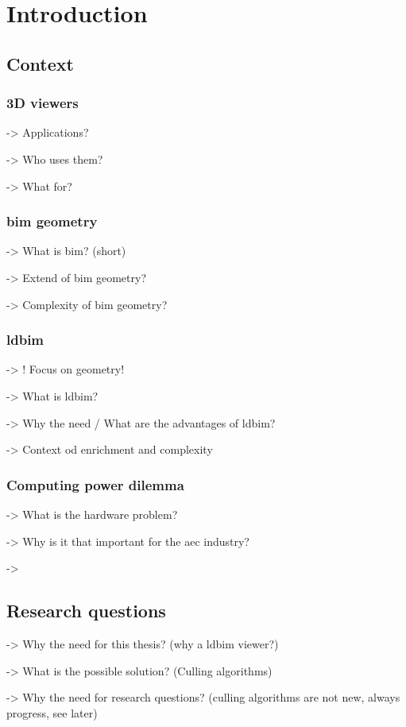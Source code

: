 \chapter{Introduction}
\section{Context}
\subsection{3D viewers}
-> Applications?

-> Who uses them?

-> What for?

\subsection{\acs{bim} geometry}
-> What is \ac{bim}? (short)

-> Extend of \ac{bim} geometry?

-> Complexity of \ac{bim} geometry?

\subsection{\acs{ldbim}}
-> ! Focus on geometry!

-> What is \ac{ldbim}?

-> Why the need / What are the advantages of \ac{ldbim}?

-> Context od enrichment and complexity

\subsection{Computing power dilemma}
-> What is the hardware problem?

-> Why is it that important for the \ac{aec} industry?

->


\section{Research questions}

-> Why the need for this thesis? (why a \ac{ldbim} viewer?)

-> What is the possible solution? (Culling algorithms)

-> Why the need for research questions?
(culling algorithms are not new, always progress, see later)

